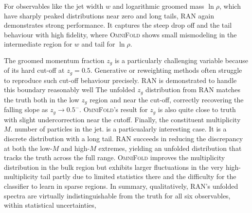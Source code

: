{{            For observables like the jet width $w$ and logarithmic groomed mass $\ln\rho$, which have sharply peaked distributions near zero and long tails, RAN again demonstrates strong performance.
            It captures the steep drop off and the tail behaviour with high fidelity, where \textsc{OmniFold} shows small mismodeling in the intermediate region for $w$ and tail for $\ln\rho$.
            
            The groomed momentum fraction $z_g$ is a particularly challenging variable because of its hard cut-off at $z_g=0.5$.
            Generative or reweighting methods often struggle to reproduce such cut-off behaviour precisely.
            RAN is demonstrated to handle this boundary reasonably well
            The unfolded $z_g$ distribution from RAN matches the truth both in the low $z_g$ region and near the cut-off, correctly recovering the falling slope as $z_g \to 0.5^-$.
            \textsc{OmniFold}’s result for $z_g$ is also quite close to truth with slight undercorrection near the cutoff.
            Finally, the constituent multiplicity $M$. number of particles in the jet. is a particualarly interesting case.
            It is a discrete distribution with a long tail.
            RAN succeeds in reducing the discrepancy at both the low-$M$ and high-$M$ extremes, yielding an unfolded distribution that tracks the truth across the full range.
            \textsc{OmniFold} improves the multiplicity distribution in the bulk region but exhibits larger fluctuations in the very high-multiplicity tail partly due to limited statistics there and the difficulty for the classifier to learn in sparse regions.
            In summary, qualitatively, RAN’s unfolded spectra are virtually indistinguishable from the truth for all six observables, within statistical uncertainties,
            
}}
